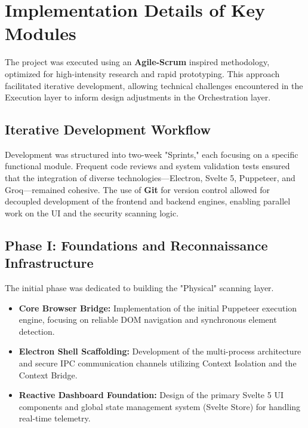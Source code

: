 \documentclass[12pt,oneside,a4paper]{book}
\begin{document}
\section{Implementation Details of Key Modules}

The project was executed using an \textbf{Agile-Scrum} inspired methodology, optimized for high-intensity research and rapid prototyping. This approach facilitated iterative development, allowing technical challenges encountered in the Execution layer to inform design adjustments in the Orchestration layer.

\subsection{Iterative Development Workflow}
Development was structured into two-week "Sprints," each focusing on a specific functional module. Frequent code reviews and system validation tests ensured that the integration of diverse technologies—Electron, Svelte 5, Puppeteer, and Groq—remained cohesive. The use of \textbf{Git} for version control allowed for decoupled development of the frontend and backend engines, enabling parallel work on the UI and the security scanning logic.

\subsection{Phase I: Foundations and Reconnaissance Infrastructure}
The initial phase was dedicated to building the "Physical" scanning layer.
\begin{itemize}
  \item \textbf{Core Browser Bridge:} Implementation of the initial Puppeteer execution engine, focusing on reliable DOM navigation and synchronous element detection.
  \item \textbf{Electron Shell Scaffolding:} Development of the multi-process architecture and secure IPC communication channels utilizing Context Isolation and the Context Bridge.
  \item \textbf{Reactive Dashboard Foundation:} Design of the primary Svelte 5 UI components and global state management system (Svelte Store) for handling real-time telemetry.
\end{itemize}
\end{document}

